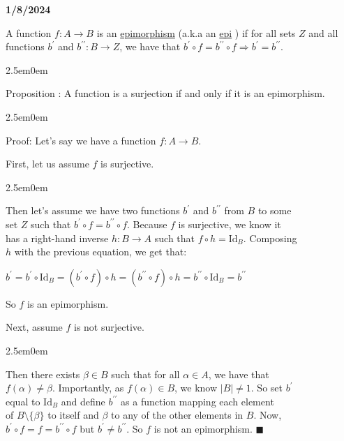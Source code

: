 \documentclass{book}
\newcommand{\hOne}{%
   \color{Black}%
   \fontsize{14}{16}\selectfont%
}
\newcommand{\hTwo}{%
   \color{MidnightBlue}%
   \fontsize{13}{15}\selectfont%
}
\newcommand{\hThree}{%
   \color{PineGreen!85!Orange}
   \fontsize{13}{15}\selectfont%
}
\newenvironment{myIndent}{%
   \begin{adjustwidth}{2.5em}{0em}%
}{%
   \end{adjustwidth}%
}
\newcommand{\udefine}[1]{{%
   \setulcolor{Red}%
   \setul{0.14em}{0.07em}%
   \ul{#1}%
}}
\newcommand*{\markDate}[1]{%
   {\huge \color{Black} \textbf{#1} \newline}%
}
\newcommand{\pprime}{{\prime\prime}}
\newcommand{\myId}{\mathrm{Id}}
\newcounter{PropNumber}
\newcommand{\propCount}{%
   \stepcounter{PropNumber}%
   \thePropNumber%
}
\newcommand{\retTwo}{\hfill\bigbreak}
\begin{document}
   \markDate{1/8/2024}

   \hOne
   A function $f: A \rightarrow B$ is an \udefine{epimorphism} 
   (a.k.a an \udefine{epi}) if for all sets $Z$ and all\\ functions $b^{\prime}$
   and $b^{\pprime}: B \rightarrow Z$, we have that 
   $b^{\prime} \circ f = b^{\pprime} \circ f \Rightarrow 
   b^{\prime} = b^{\pprime}$.

   
   \begin{myIndent}
      \hTwo
      Proposition \propCount: A function is a surjection if and
      only if it is an epimorphism.
      
      \hThree
      \begin{myIndent}
         Proof: Let's say we have a function $f: A \rightarrow B$.
         \hfill \bigbreak

         First, let us assume $f$ is surjective.
         \begin{myIndent}
               Then let's assume we have two functions $b^\prime$ and $b^\pprime$ from $B$ to some\\ set $Z$ such that $b^\prime \circ f = b^\pprime \circ f$. Because $f$ is surjective, we know it\\ has a right-hand inverse $h: B \rightarrow A$ such that $f \circ h = \myId_B$. Composing\\ $h$ with the previous equation, we get that:

               {\center $b^{\prime} = b^{\prime} \circ \myId_B = (b^\prime \circ f) \circ h = (b^\pprime \circ f) \circ h = b^\pprime \circ \myId_B = b^\pprime$\retTwo\par}

               So $f$ is an epimorphism.\retTwo
         \end{myIndent}

         Next, assume $f$ is not surjective.
         \begin{myIndent}
            Then there exists $\beta \in B$ such that for all $\alpha \in A$, we have that\\ $f(\alpha) \neq \beta$. Importantly, as $f(\alpha) \in B$, we know $|B| \neq 1$. So set $b^\prime$\\ equal to $\myId_B$ and define $b^\pprime$ as a function mapping each element\\ of $B \setminus \{\beta \}$ to itself and $\beta$ to any of the other elements in $B$. Now,\\
            $b^\prime \circ f = f = b^\pprime \circ f$ but $b^\prime \neq b^\pprime$. So $f$ is not an epimorphism. $\blacksquare$\retTwo
         \end{myIndent}
      \end{myIndent}
   \end{myIndent}
\end{document}
